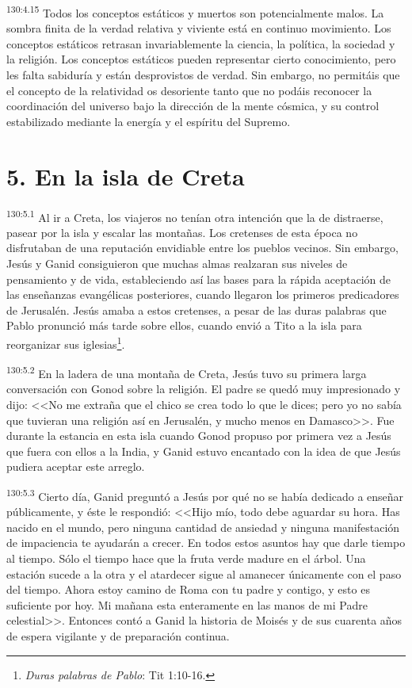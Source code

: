 \par 
\textsuperscript{130:4.15} Todos los conceptos estáticos y muertos son potencialmente malos. La sombra finita de la verdad relativa y viviente está en continuo movimiento. Los conceptos estáticos retrasan invariablemente la ciencia, la política, la sociedad y la religión. Los conceptos estáticos pueden representar cierto conocimiento, pero les falta sabiduría y están desprovistos de verdad. Sin embargo, no permitáis que el concepto de la relatividad os desoriente tanto que no podáis reconocer la coordinación del universo bajo la dirección de la mente cósmica, y su control estabilizado mediante la energía y el espíritu del Supremo.

\section*{5. En la isla de Creta}
\par 
\textsuperscript{130:5.1} Al ir a Creta, los viajeros no tenían otra intención que la de distraerse, pasear por la isla y escalar las montañas. Los cretenses de esta época no disfrutaban de una reputación envidiable entre los pueblos vecinos. Sin embargo, Jesús y Ganid consiguieron que muchas almas realzaran sus niveles de pensamiento y de vida, estableciendo así las bases para la rápida aceptación de las enseñanzas evangélicas posteriores, cuando llegaron los primeros predicadores de Jerusalén. Jesús amaba a estos cretenses, a pesar de las duras palabras que Pablo pronunció más tarde sobre ellos, cuando envió a Tito a la isla para reorganizar sus iglesias\footnote{\textit{Duras palabras de Pablo}: Tit 1:10-16.}.

\par 
\textsuperscript{130:5.2} En la ladera de una montaña de Creta, Jesús tuvo su primera larga conversación con Gonod sobre la religión. El padre se quedó muy impresionado y dijo: <<No me extraña que el chico se crea todo lo que le dices; pero yo no sabía que tuvieran una religión así en Jerusalén, y mucho menos en Damasco>>. Fue durante la estancia en esta isla cuando Gonod propuso por primera vez a Jesús que fuera con ellos a la India, y Ganid estuvo encantado con la idea de que Jesús pudiera aceptar este arreglo.

\par 
\textsuperscript{130:5.3} Cierto día, Ganid preguntó a Jesús por qué no se había dedicado a enseñar públicamente, y éste le respondió: <<Hijo mío, todo debe aguardar su hora. Has nacido en el mundo, pero ninguna cantidad de ansiedad y ninguna manifestación de impaciencia te ayudarán a crecer. En todos estos asuntos hay que darle tiempo al tiempo. Sólo el tiempo hace que la fruta verde madure en el árbol. Una estación sucede a la otra y el atardecer sigue al amanecer únicamente con el paso del tiempo. Ahora estoy camino de Roma con tu padre y contigo, y esto es suficiente por hoy. Mi mañana esta enteramente en las manos de mi Padre celestial>>. Entonces contó a Ganid la historia de Moisés y de sus cuarenta años de espera vigilante y de preparación continua.

